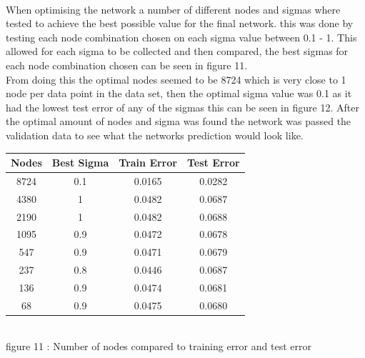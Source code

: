 \documentclass{IEEEtran}[11pt]
\begin{document}
\begin{flushleft}
  \\
  \vspace{1.5mm}
  When optimising the network a number of different nodes and sigmas where
  tested to achieve the best possible value for the final network. this was done
  by testing each node combination chosen on each sigma value between 0.1 - 1.
  This allowed for each sigma to be collected and then compared, the best sigmas
  for each node combination chosen can be seen in figure 11.
  \\
  \vspace{1.5mm}
  From doing this the optimal nodes seemed to be 8724 which is very close to 1
  node per data point in the data set, then the optimal sigma value was 0.1 as
  it had the lowest test error of any of the sigmas this can be seen in
  figure 12. After the optimal amount of nodes and sigma was found the network
  was passed the validation data to see what the networks prediction would look
  like.
  \\
  \vspace{1.5mm}
\end{flushleft}
  \begin{center}
    \begin{tabular}{||c c c c||}
      \hline
      Nodes & Best Sigma & Train Error & Test Error \\ [0.5ex]
      \hline
      8724 & 0.1 & 0.0165 & 0.0282 \\
      4380 & 1 & 0.0482 & 0.0687 \\
      2190 & 1 & 0.0482 & 0.0688 \\
      1095 & 0.9 & 0.0472 & 0.0678\\
      547  & 0.9 & 0.0471 & 0.0679\\
      237  & 0.8 & 0.0446 & 0.0687\\
      136  & 0.9 & 0.0474 & 0.0681\\
      68   & 0.9 & 0.0475 & 0.0680\\
      \hline
    \end{tabular}
    \\
    \vspace{2.5mm}
    {\footnotesize figure 11 : Number of nodes compared to training error and
    test error}
    \\
    \vspace{2.5mm}
  \end{center}
\end{document}
